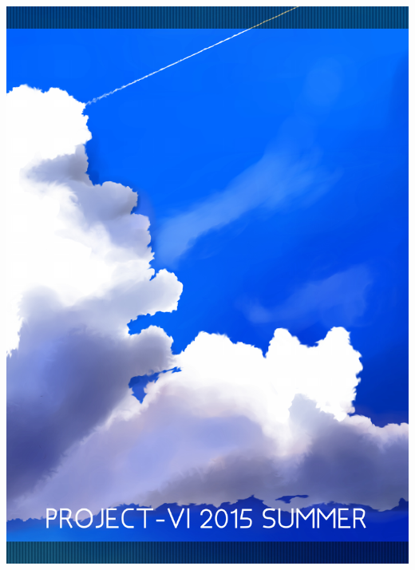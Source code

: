 ﻿\documentclass[9pt,b5paper,tombo,openany]{jsbook}
\begin{document}
\mbox{}
\newpage
\thispagestyle{empty}
\mbox{}
\newpage
\thispagestyle{empty}

\newpage

\enlargethispage{\paperwidth}
\thispagestyle{empty}
\vspace*{-1truein}
\vspace*{-\topmargin}
\vspace*{-1.15\headheight}
\vspace*{-\headsep}
\vspace*{-\topskip}
\noindent\hspace*{-1.16in}\hspace*{-\oddsidemargin}
\includegraphics[width=1.042\paperwidth]{./img/ura-hyoushi.pdf}
\end{document}
